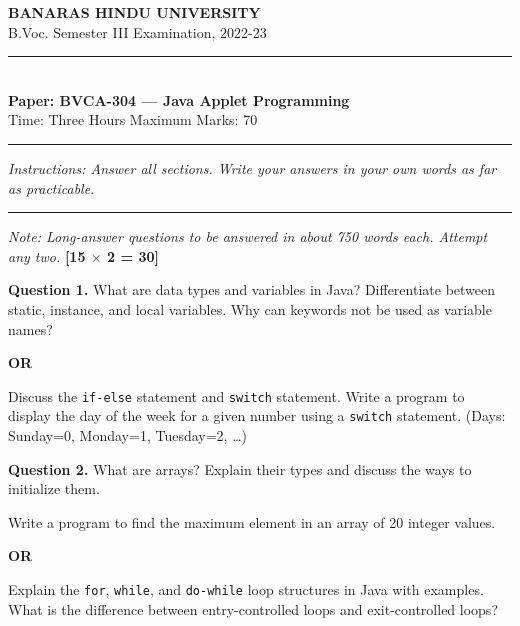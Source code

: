\documentclass[11pt,a4paper]{article}
\begin{document}
\begin{center}
  {\large\bfseries BANARAS HINDU UNIVERSITY}\\[2pt]
  {\normalsize B.Voc. Semester III Examination, 2022-23}\\[6pt]
  \rule{0.8\linewidth}{0.5pt}\\[6pt]
  {\large\bfseries Paper: BVCA-304 --- Java Applet Programming}\\[4pt]
  {\normalsize Time: Three Hours \hfill Maximum Marks: 70}
\end{center}

\rule{\linewidth}{0.4pt}

\smallskip



\noindent   \textit{Instructions: Answer all sections. Write your answers in your own words as far as practicable.}

\bigskip

\bigskip


\rule{\linewidth}{0.4pt}\smallskip




\noindent   \textit{Note: Long-answer questions to be answered in about 750 words each. Attempt any two.} \hfill   \textbf{[15 $ \times$ 2 = 30]}

\medskip


\noindent   \textbf{Question 1.} What are data types and variables in Java? Differentiate between static, instance, and local variables. Why can keywords not be used as variable names?
\centerline{   \textbf{OR}}
Discuss the   \texttt{if-else} statement and   \texttt{switch} statement. Write a program to display the day of the week for a given number using a   \texttt{switch} statement. (Days: Sunday=0, Monday=1, Tuesday=2, \ldots)

\medskip


\noindent   \textbf{Question 2.} What are arrays? Explain their types and discuss the ways to initialize them.

\begin{parts}
  \item Write a program to find the maximum element in an array of 20 integer values.
\end{parts}
\centerline{   \textbf{OR}}
Explain the   \texttt{for},   \texttt{while}, and   \texttt{do-while} loop structures in Java with examples. What is the difference between entry-controlled loops and exit-controlled loops?

\bigskip
\end{document}
